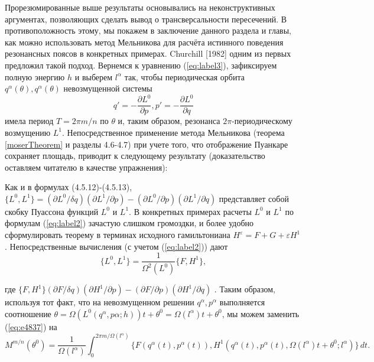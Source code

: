 \documentclass[twoside, a4paper]{article}
\begin{document}
Прорезюмированные выше результаты основывались на неконструктивных аргументах, позволяющих сделать вывод о трансверсальности пересечений. В противоположность этому, мы покажем в заключение данного раздела и главы, как можно использовать метод Мельникова для расчёта истинного поведения резонансных поясов в конкретных примерах.
Churchill [1982] одним из первых предложил такой подход. Вернемся к уравнению (\ref{eq:label3}), зафиксируем полную энергию $h$ и выберем $l^\alpha$ так, чтобы периодическая орбита $q^\alpha(\theta),  q^\alpha(\theta)$ невозмущенной системы
\begin{equation}
q' = -\frac{\partial L^0}{\partial p}, p'=-\frac{\partial L^0}{\partial q}
\end{equation}
имела период $T=2 \pi m/n$ по $\theta$ и, таким образом, резонанса $2 \pi$-периодическому возмущению $L^1$. Непосредственное применение метода Мельникова (теорема \ref{moserTheorem} и разделы 4.6-4.7) при учете того, что отображение Пуанкаре сохраняет площадь, приводит к следующему результату (доказательство оставляем читателю в качестве упражнения):
\label{th3}

Как и в формулах (4.5.12)-(4.5.13), $\{L^0,L^1\}=(\partial L^0/\delta q)(\partial L^1/ \partial p) - (\partial L^0/\partial p)(\partial L^1 / \partial q)$ представляет собой скобку Пуассона функций $L^0$ и $L^1$. В конкретных примерах расчеты $L^0$ и $L^1$ по формулам (\ref{eq:label2}) зачастую слишком громоздки, и более удобно сформулировать теорему в терминах исходного гамильтониана $H^\varepsilon=F+G+\varepsilon H^1$. Непосредственные вычисления (с учетом (\ref{eq:label2})) дают
\begin{equation}
\{L^0,L^1\} = \frac{1}{\Omega^2(L^0)}\{F, H^1\},
\end{equation}

где $\{F, H^1\}(\partial F/\delta q)(\partial H^1/ \partial p) - (\partial F/\partial p)(\partial H^1 / \partial q)$ . Таким образом, используя тот факт, что на невозмущенном решении $q^\alpha, p^\alpha$ выполняется соотношение $\theta = \Omega(L^0(q^\alpha,p\alpha;h))t+\theta^0=\Omega(l^\alpha)t+\theta^0$, мы можем заменить (\ref{eq:e4837}) на
 \begin{equation}
 M^{m/n}(\theta^0)=\frac{1}{\Omega (l^\alpha)} \int_0^{2\pi m/\Omega (l^\alpha)} \{F(q^\alpha(t),p^\alpha(t)),H^1(q^\alpha(t),p^\alpha(t),\Omega(l^\alpha)t+\theta^0; l^\alpha)\}\,dt.
\end{equation}
\end{document}
